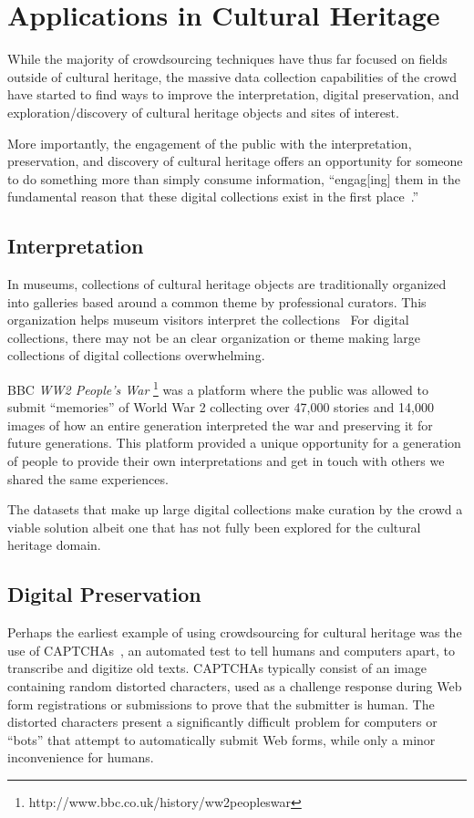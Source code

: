 \documentclass[10pt,twocolumn]{article}
\begin{document}
\section{Applications in Cultural Heritage}
\label{sec:applications-heritage}
While the majority of crowdsourcing techniques have thus far focused on fields
outside of cultural heritage, the massive data collection capabilities of the
crowd have started to find ways to improve the interpretation, digital 
preservation, and exploration/discovery of cultural heritage objects and sites
of interest.

More importantly, the engagement of the public with the interpretation, 
preservation, and discovery of cultural heritage offers an opportunity for
someone to do something more than simply consume information, ``engag[ing] them
in the fundamental reason that these digital collections exist in the
first place~\cite{Owens2013}.''

\subsection{Interpretation}

In museums, collections of cultural heritage objects are traditionally organized
into galleries based around a common theme by professional curators. This
organization helps museum visitors interpret the collections~\cite{Aletras2012}
For digital collections, there may not be an clear organization or theme making
large collections of digital collections overwhelming. 

BBC \textit{WW2 People's War}
\footnote{http://www.bbc.co.uk/history/ww2peopleswar} was a platform
where the public was allowed to submit ``memories'' of World War 2 collecting 
over 47,000 stories and 14,000 images of how an entire generation 
interpreted the war and preserving it for future generations. This platform
provided a unique opportunity for a generation of people to provide their 
own interpretations and get in touch with others we shared the same 
experiences.

The datasets that make up large digital collections make curation by the crowd 
a viable solution albeit one that has not fully been explored for the cultural
heritage domain.

\subsection{Digital Preservation}

Perhaps the earliest example of using crowdsourcing for cultural heritage was
the use of CAPTCHAs~\cite{Ahn2003}, an automated test to tell humans and computers apart, to transcribe and digitize old texts. CAPTCHAs typically 
consist of an image containing random distorted characters, used as a challenge
response during Web form registrations or submissions to prove that the 
submitter is human. The distorted characters present a significantly 
difficult problem for computers or ``bots'' that attempt to automatically submit Web forms, while only a minor inconvenience for humans.
\end{document}
